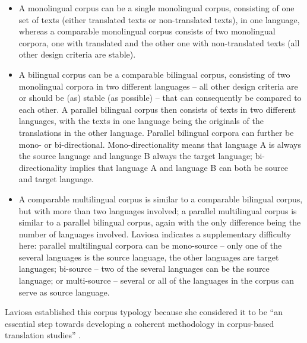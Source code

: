 \begin{itemize}
\item 
A monolingual corpus can be a single monolingual corpus, consisting of one set of texts (either translated texts or non-translated texts), in one language, whereas a comparable monolingual corpus consists of two monolingual corpora, one with translated and the other one with non-translated texts (all other design criteria are stable).
\item 
A bilingual corpus can be a comparable bilingual corpus, consisting of two monolingual corpora in two different languages – all other design criteria are or should be (as) stable (as possible) – that can consequently be compared to each other. A parallel bilingual corpus then consists of texts in two different languages, with the texts in one language being the originals of the translations in the other language. Parallel bilingual corpora can further be mono- or bi-directional. Mono-directionality means that language A is always the source language and language B always the target language; bi-directionality implies that language A and language B can both be source and target language.
\item 
A comparable multilingual corpus is similar to a comparable bilingual corpus, but with more than two languages involved; a parallel multilingual corpus is similar to a parallel bilingual corpus, again with the only difference being the number of languages involved. Laviosa indicates a supplementary difficulty here: parallel multilingual corpora can be mono-source – only one of the several languages is the source language, the other languages are target languages; bi-source – two of the several languages can be the source language; or multi-source – several or all of the languages in the corpus can serve as source language.
\end{itemize}

Laviosa established this corpus typology because she considered it to be “an essential step towards developing a coherent methodology in corpus-based translation studies” \citep[38]{laviosa_corpus-based_2002}.

